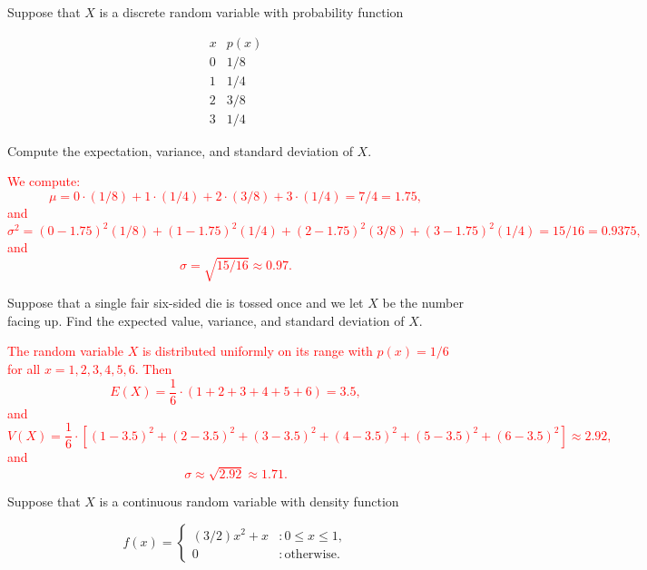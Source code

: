 \documentclass[12pt,reqno]{amsart}
\begin{document}
\bigskip
\prob Suppose that $X$ is a discrete random variable with probability function

	\[
	\begin{array}{c|c}
	x & p(x) \\ \hline
	0 & 1/8   \\
	1 & 1/4   \\
	2 & 3/8  \\
	3 & 1/4 
	\end{array}
	\]

Compute the expectation, variance, and standard deviation of $X$.

\bigskip
\textcolor{red}{We compute:
	\[
	\mu = 0\cdot(1/8) + 1 \cdot(1/4) + 2\cdot(3/8) + 3\cdot(1/4) = 7/4 = 1.75,
	\]
and
	\[
	\sigma^2 = (0-1.75)^2(1/8) + (1-1.75)^2(1/4) + (2-1.75)^2(3/8) + (3-1.75)^2(1/4) = 15/16 = 0.9375,
	\]
and
	\[
	\sigma = \sqrt{15/16} \approx 0.97.
	\]}



















\bigskip
\prob Suppose that a single fair six-sided die is tossed once and we let $X$ be the number facing up. Find the expected value, variance, and standard deviation of $X$.

\bigskip
\textcolor{red}{The random variable $X$ is distributed uniformly on its range with $p(x) = 1/6$ for all $x=1,2,3,4,5,6$. Then
	\[
	E(X) = \frac{1}{6} \cdot (1+2+3+4+5+6) = 3.5,
	\]
and
	\[
	V(X) = \frac{1}{6}\cdot \left[ (1-3.5)^2 + (2-3.5)^2 + (3-3.5)^2 + (4-3.5)^2 + (5-3.5)^2 + (6-3.5)^2\right] \approx 2.92,
	\]
and
	\[
	\sigma \approx \sqrt{2.92} \approx 1.71.
	\]}



















\bigskip
\prob Suppose that $X$ is a continuous random variable with density function
	
	\[
	f(x) = \begin{cases}
	(3/2)x^2 + x & : 0\leq x \leq 1, \\
	0 & : \text{otherwise}.
	\end{cases}
	\]
\end{document}
